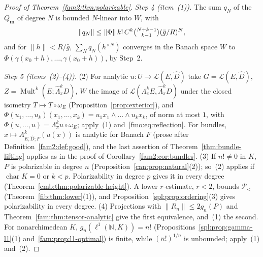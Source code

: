 \documentclass[11pt]{amsart}
\theoremstyle{definition}
\theoremstyle{remark}
\numberwithin{equation}{section}
\newcommand{\N}{\mathbb N}
\newcommand{\cL}{\mathcal L}
\newcommand{\Mult}{\operatorname{Mult}}
\newcommand{\norm}[1]{\lVert #1\rVert}
\theoremstyle{plain}
\theoremstyle{definition}
\theoremstyle{plain}
\newcommand{\hLambda}{\widehat\Lambda}
\newcommand{\cP}{\mathcal P}
\begin{document}
\begin{proof}[Proof of Theorem~\ref{fam2:thm:polarizable}]
\emph{Step 4 (item~(1)).} The sum $q_N$ of the $Q_{\mathbf m}$ of degree $N$ is bounded $N$-linear into $W$, with
\begin{equation}\label{fmo:eq:reflection}
 \norm{q_N}\le\norm\Phi\,k!\,C^k\tbinom{N+k-1}{k-1}(\bar g/R)^N ,
\end{equation}
and for $\norm h<R/\bar g$, $\sum_Nq_N(h^{\times N})$ converges in the Banach space $W$ to $\Phi(\gamma(x_0+h),\dots,
\gamma(x_0+h))$, by Step~2.

\emph{Step 5 (items~(2)--(4)).} (2) For analytic $u\colon U\to\cL(E,\widehat D)$ take $G=\cL(E,\widehat D)$,
$Z=\Mult^k(E;\hLambda^k_\pi D)$, $W$ the image of $\cL(\Lambda^k_\pi E,\hLambda^k_\pi D)$ under the closed isometry
$T\mapsto T\circ\omega_E$ (Proposition~\ref{prop:exterior}), and $\Phi(u_1,\dots,u_k)(x_1,\dots,x_k)=u_1x_1\wedge\dots\wedge
u_kx_k$, of norm at most $1$, with $\Phi(u,\dots,u)=\Lambda^k_\pi u\circ\omega_E$; apply~(1) and~\eqref{fmo:eq:reflection}.
For bundles, $x\mapsto A^k_{E,\widehat D;F}(u(x))$ is analytic for Banach $F$ (prose after Definition~\ref{fam2:def:good}),
and the last assertion of Theorem~\ref{thm:bundle-lifting} applies as in the proof of Corollary~\ref{fam2:cor:bundles}.
(3) If $n!\ne0$ in $K$, $P$
is polarizable in degree $n$ (Proposition~\ref{can:prop:natural}(2)); so~(2) applies if $\operatorname{char}K=0$ or
$k<p$. Polarizability in
degree $p$ gives it in every degree (Theorem~\ref{cmb:thm:polarizable-height}). A lower $r$-estimate, $r<2$, bounds
$\cP_<$ (Theorem~\ref{fib:thm:lower}(1)), and Proposition~\ref{spl:prop:ordering}(3) gives polarizability in every degree.
(4) Projections with $\norm{R_n}\le2g_n(P)$ and Theorem~\ref{fam:thm:tensor-analytic} give the first equivalence, and~(1)
the second. For nonarchimedean $K$, $g_n(\ell^1(\N,K))=n!$ (Propositions~\ref{spl:prop:gamma-l1}(1)
and~\ref{fam:prop:l1-optimal}) is finite, while $(n!)^{1/n}$ is unbounded; apply~(1) and~(2).
\end{proof}
\end{document}
